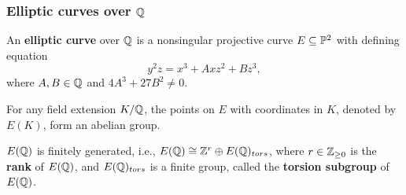 \documentclass[handout]{beamer}
\begin{document}
\begin{frame}
\frametitle{Elliptic curves over $\mathbb{Q}$}
\begin{Def}
An {\bf elliptic curve }over $\mathbb{Q}$ is a nonsingular projective curve $E \subseteq \mathbb{P}^2$ with defining equation 
\begin{equation*}
y^2z = x^3 + Axz^2+Bz^3, 
\end{equation*}
where $A,B \in \mathbb{Q}$ and  $4A^3+27B^2 \neq 0$.\\
\end{Def}

\pause


For any field extension $K/\mathbb{Q}$, the points on $E$ with coordinates in $K$, denoted by $E(K)$, form an abelian group. \\

\pause

\begin{theorem}
$E(\mathbb{Q})$ is finitely generated, i.e., $E(\mathbb{Q}) \cong \mathbb{Z}^r \oplus E(\mathbb{Q})_{tors}$, where $r \in \mathbb{Z}_{\geq 0}$ is the {\bf rank} of $E(\mathbb{Q})$, and $E(\mathbb{Q})_{tors}$ is a finite group, called the {\bf torsion subgroup} of $E(\mathbb{Q})$.
\end{theorem}


\end{frame}


\end{document}
